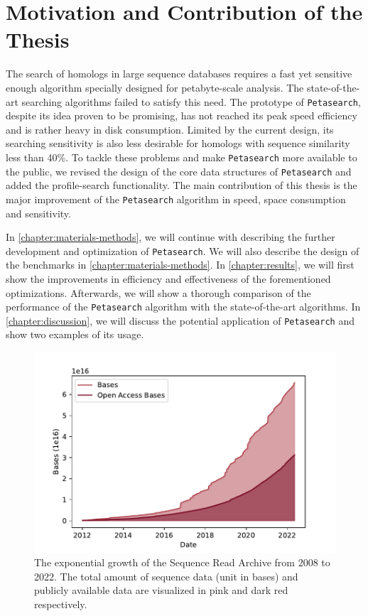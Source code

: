 \section{Motivation and Contribution of the Thesis}

The search of homologs in large sequence databases requires a fast yet sensitive enough algorithm specially designed for petabyte-scale analysis. The state-of-the-art searching algorithms failed to satisfy this need. The prototype of \texttt{Petasearch}, despite its idea proven to be promising, has not reached its peak speed efficiency and is rather heavy in disk consumption. Limited by the current design, its searching sensitivity is also less desirable for homologs with sequence similarity less than 40\%. To tackle these problems and make \texttt{Petasearch} more available to the public, we revised the design of the core data structures of \texttt{Petasearch} and added the profile-search functionality. The main contribution of this thesis is the major improvement of the \texttt{Petasearch} algorithm in speed, space consumption and sensitivity.

In \cref{chapter:materials-methods}, we will continue with describing the further development and optimization of \texttt{Petasearch}. We will also describe the design of the benchmarks in \cref{chapter:materials-methods}. In \cref{chapter:results}, we will first show the improvements in efficiency and effectiveness of the forementioned optimizations. Afterwards, we will show a thorough comparison of the performance of the \texttt{Petasearch} algorithm with the state-of-the-art algorithms. In \cref{chapter:discussion}, we will discuss the potential application of \texttt{Petasearch} and show two examples of its usage.

\pagebreak

\begin{figpage}
\begin{figure}[t]
  \centering
  \includegraphics[width=\textwidth]{images/sra_stat.pdf}
  \caption{The exponential growth of the Sequence Read Archive from 2008 to 2022. The total amount of sequence data (unit in bases) and publicly available data are visualized in pink and dark red respectively.}
  \label{fig:sra_stat}
\end{figure}
\end{figpage}
